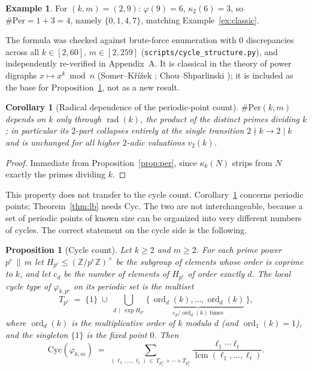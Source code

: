 \documentclass[11pt]{article}
\newtheorem{proposition}[theorem]{Proposition}
\newtheorem{corollary}[theorem]{Corollary}
\theoremstyle{definition}
\newtheorem{example}[theorem]{Example}
\theoremstyle{remark}
\newcommand{\Cyc}{\mathrm{Cyc}}
\newcommand{\Per}{\mathrm{Per}}
\DeclareMathOperator{\ord}{ord}
\DeclareMathOperator{\rad}{rad}
\DeclareMathOperator{\lcmop}{lcm}
\begin{document}
\begin{example}
For $(k,m) = (2,9)$: $\varphi(9) = 6$, $\kappa_2(6) = 3$, so $\#\Per = 1 + 3 = 4$, namely $\{0,1,4,7\}$, matching Example~\ref{ex:classic}.
\end{example}

The formula was checked against brute-force enumeration with 0 discrepancies across all $k \in [2,60]$, $m \in [2,259]$ (\texttt{scripts/cycle\_structure.py}), and independently re-verified in Appendix~A. It is classical in the theory of power digraphs $x \mapsto x^k \bmod n$ (Somer--K\v{r}\'i\v{z}ek \cite{somer-krizek}; Chou--Shparlinski \cite{chou-shparlinski}); it is included as the base for Proposition~\ref{prop:cyc}, not as a new result.

\begin{corollary}[Radical dependence of the periodic-point count]\label{cor:radical}
$\#\Per(k,m)$ depends on $k$ only through $\rad(k)$, the product of the distinct primes dividing $k$; in particular its $2$-part collapses entirely at the single transition $2 \nmid k \to 2 \mid k$ and is unchanged for all higher $2$-adic valuations $v_2(k)$.
\end{corollary}

\begin{proof}
Immediate from Proposition~\ref{prop:per}, since $\kappa_k(N)$ strips from $N$ exactly the primes dividing $k$.
\end{proof}

This property does not transfer to the cycle count. Corollary~\ref{cor:radical} concerns periodic points; Theorem~\ref{thm:lb} needs $\Cyc$. The two are not interchangeable, because a set of periodic points of known size can be organized into very different numbers of cycles. The correct statement on the cycle side is the following.

\begin{proposition}[Cycle count]\label{prop:cyc}
Let $k \ge 2$ and $m \ge 2$. For each prime power $p^e \,\|\, m$ let $H_{p^e} \le (\mathbb{Z}/p^e\mathbb{Z})^\times$ be the subgroup of elements whose order is coprime to $k$, and let $c_d$ be the number of elements of $H_{p^e}$ of order exactly $d$. The local cycle type of $\varphi_{k,p^e}$ on its periodic set is the multiset
\[
T_{p^e} \;=\; \{1\} \;\cup\; \bigcup_{d \,\mid\, \exp H_{p^e}} \Big\{\, \underbrace{\ord_d(k), \dots, \ord_d(k)}_{c_d/\ord_d(k) \ \text{times}} \,\Big\},
\]
where $\ord_d(k)$ is the multiplicative order of $k$ modulo $d$ (and $\ord_1(k) = 1$), and the singleton $\{1\}$ is the fixed point $0$. Then
\[
\Cyc(\varphi_{k,m}) \;=\; \sum_{(\ell_1,\dots,\ell_t) \,\in\, T_{p_1^{e_1}} \times \cdots \times T_{p_t^{e_t}}} \frac{\ell_1 \cdots \ell_t}{\lcmop(\ell_1,\dots,\ell_t)}.
\]
\end{proposition}
\end{document}
